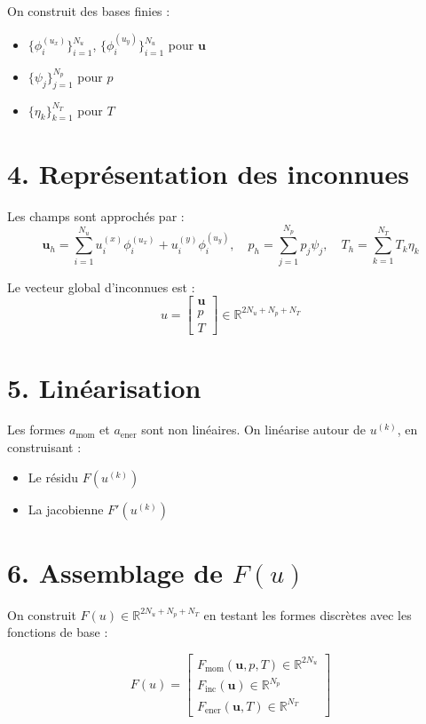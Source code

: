 \documentclass[11pt]{article}
\begin{document}
On construit des bases finies :

\begin{itemize}
  \item \( \{ \phi_i^{(u_x)} \}_{i=1}^{N_u} \), \( \{ \phi_i^{(u_y)} \}_{i=1}^{N_u} \) pour \( \mathbf{u} \)
  \item \( \{ \psi_j \}_{j=1}^{N_p} \) pour \( p \)
  \item \( \{ \eta_k \}_{k=1}^{N_T} \) pour \( T \)
\end{itemize}

\section*{4. Représentation des inconnues}

Les champs sont approchés par :
\[
\mathbf{u}_h = \sum_{i=1}^{N_u} u_i^{(x)} \phi_i^{(u_x)} + u_i^{(y)} \phi_i^{(u_y)}, \quad
p_h = \sum_{j=1}^{N_p} p_j \psi_j, \quad
T_h = \sum_{k=1}^{N_T} T_k \eta_k
\]

Le vecteur global d’inconnues est :
\[
u = \begin{bmatrix}
\mathbf{u} \\
p \\
T
\end{bmatrix}
\in \mathbb{R}^{2N_u + N_p + N_T}
\]

\section*{5. Linéarisation}

Les formes \( a_{\text{mom}} \) et \( a_{\text{ener}} \) sont non linéaires. On linéarise autour de \( u^{(k)} \), en construisant :

\begin{itemize}
  \item Le résidu \( F(u^{(k)}) \)
  \item La jacobienne \( F'(u^{(k)}) \)
\end{itemize}

\section*{6. Assemblage de \( F(u) \)}

On construit \( F(u) \in \mathbb{R}^{2N_u + N_p + N_T} \) en testant les formes discrètes avec les fonctions de base :

\[
F(u) =
\begin{bmatrix}
F_{\text{mom}}(\mathbf{u}, p, T) \in \mathbb{R}^{2N_u} \\
F_{\text{inc}}(\mathbf{u}) \in \mathbb{R}^{N_p} \\
F_{\text{ener}}(\mathbf{u}, T) \in \mathbb{R}^{N_T}
\end{bmatrix}
\]
\end{document}
